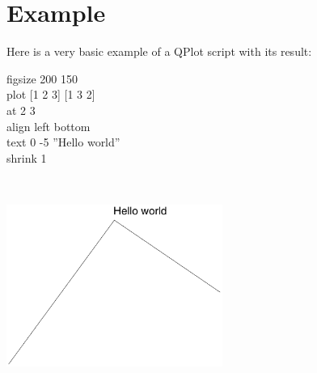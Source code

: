 \documentclass[11pt]{article}
\begin{document}
\section{Example}

Here is a very basic example of a QPlot script with its result:\medskip

\begin{centering}\noindent%
\begin{minipage}[b]{.3\textwidth}
figsize 200 150\\
plot [1 2 3] [1 3 2]\\
at 2 3\\
align left bottom\\
text 0 -5 ''Hello world''\\
shrink 1
\end{minipage}
~
~
\begin{minipage}[b]{.45\textwidth}
\includegraphics[width=200pt]{directuse-eg}
\end{minipage}

\end{centering}
\medskip

  
\end{document}
